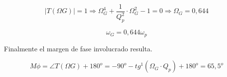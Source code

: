 \begin{equation}
    |T(\Omega G)| = 1 \Longrightarrow \Omega _G ^4 + \frac{1}{Q_p^2} \cdot \Omega_G^2 - 1 = 0 \Longrightarrow \Omega _G = 0,644
\end{equation}

\begin{equation}
    \omega _G = 0,644 \omega _p
\end{equation}

\bigskip
\hspace{1mm} Finalmente el margen de fase involucrado resulta.

\begin{equation}
    M \phi = \angle T(\Omega G) + 180 ^o = -90^o - tg^1 ( \Omega _G \cdot Q_p) + 180^o = 65,5^o 
\end{equation}

